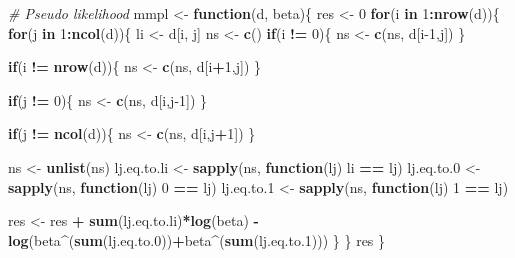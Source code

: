 \documentclass[
]{article}
\newenvironment{Shaded}{\begin{snugshade}}{\end{snugshade}}
\newcommand{\CommentTok}[1]{\textcolor[rgb]{0.56,0.35,0.01}{\textit{#1}}}
\newcommand{\ControlFlowTok}[1]{\textcolor[rgb]{0.13,0.29,0.53}{\textbf{#1}}}
\newcommand{\DecValTok}[1]{\textcolor[rgb]{0.00,0.00,0.81}{#1}}
\newcommand{\FloatTok}[1]{\textcolor[rgb]{0.00,0.00,0.81}{#1}}
\newcommand{\KeywordTok}[1]{\textcolor[rgb]{0.13,0.29,0.53}{\textbf{#1}}}
\newcommand{\NormalTok}[1]{#1}
\newcommand{\OperatorTok}[1]{\textcolor[rgb]{0.81,0.36,0.00}{\textbf{#1}}}
\newcommand{\StringTok}[1]{\textcolor[rgb]{0.31,0.60,0.02}{#1}}
\begin{document}
\begin{Shaded}
\begin{Highlighting}[]
\CommentTok{# Pseudo likelihood }
\NormalTok{mmpl <-}\StringTok{ }\ControlFlowTok{function}\NormalTok{(d, beta)\{}
\NormalTok{  res <-}\StringTok{ }\DecValTok{0}
  \ControlFlowTok{for}\NormalTok{(i }\ControlFlowTok{in} \DecValTok{1}\OperatorTok{:}\KeywordTok{nrow}\NormalTok{(d))\{}
    \ControlFlowTok{for}\NormalTok{(j }\ControlFlowTok{in} \DecValTok{1}\OperatorTok{:}\KeywordTok{ncol}\NormalTok{(d))\{}
\NormalTok{      li <-}\StringTok{ }\NormalTok{d[i, j]}
\NormalTok{      ns <-}\StringTok{ }\KeywordTok{c}\NormalTok{()}
      \ControlFlowTok{if}\NormalTok{(i }\OperatorTok{!=}\StringTok{ }\DecValTok{0}\NormalTok{)\{}
\NormalTok{        ns <-}\StringTok{ }\KeywordTok{c}\NormalTok{(ns, d[i}\DecValTok{-1}\NormalTok{,j])}
\NormalTok{      \}}
      
      \ControlFlowTok{if}\NormalTok{(i }\OperatorTok{!=}\StringTok{ }\KeywordTok{nrow}\NormalTok{(d))\{}
\NormalTok{        ns <-}\StringTok{ }\KeywordTok{c}\NormalTok{(ns, d[i}\OperatorTok{+}\DecValTok{1}\NormalTok{,j])}
\NormalTok{      \}}
      
      
      \ControlFlowTok{if}\NormalTok{(j }\OperatorTok{!=}\StringTok{ }\DecValTok{0}\NormalTok{)\{}
\NormalTok{        ns <-}\StringTok{ }\KeywordTok{c}\NormalTok{(ns, d[i,j}\DecValTok{-1}\NormalTok{])}
\NormalTok{      \}}
      
      \ControlFlowTok{if}\NormalTok{(j }\OperatorTok{!=}\StringTok{ }\KeywordTok{ncol}\NormalTok{(d))\{}
\NormalTok{        ns <-}\StringTok{ }\KeywordTok{c}\NormalTok{(ns, d[i,j}\OperatorTok{+}\DecValTok{1}\NormalTok{])}
\NormalTok{      \}}
      
\NormalTok{      ns <-}\StringTok{ }\KeywordTok{unlist}\NormalTok{(ns)}
\NormalTok{      lj.eq.to.li <-}\StringTok{ }\KeywordTok{sapply}\NormalTok{(ns, }\ControlFlowTok{function}\NormalTok{(lj) li }\OperatorTok{==}\StringTok{ }\NormalTok{lj)}
\NormalTok{      lj.eq.to}\FloatTok{.0}\NormalTok{ <-}\StringTok{ }\KeywordTok{sapply}\NormalTok{(ns, }\ControlFlowTok{function}\NormalTok{(lj) }\DecValTok{0} \OperatorTok{==}\StringTok{ }\NormalTok{lj)}
\NormalTok{      lj.eq.to}\FloatTok{.1}\NormalTok{ <-}\StringTok{ }\KeywordTok{sapply}\NormalTok{(ns, }\ControlFlowTok{function}\NormalTok{(lj) }\DecValTok{1} \OperatorTok{==}\StringTok{ }\NormalTok{lj)}
      
\NormalTok{      res <-}\StringTok{ }\NormalTok{res }\OperatorTok{+}\StringTok{ }\KeywordTok{sum}\NormalTok{(lj.eq.to.li)}\OperatorTok{*}\KeywordTok{log}\NormalTok{(beta) }\OperatorTok{-}\StringTok{ }\KeywordTok{log}\NormalTok{(beta}\OperatorTok{^}\NormalTok{(}\KeywordTok{sum}\NormalTok{(lj.eq.to}\FloatTok{.0}\NormalTok{))}\OperatorTok{+}\NormalTok{beta}\OperatorTok{^}\NormalTok{(}\KeywordTok{sum}\NormalTok{(lj.eq.to}\FloatTok{.1}\NormalTok{)))}
\NormalTok{    \}}
\NormalTok{  \}}
\NormalTok{  res}
\NormalTok{\}}


\end{Highlighting}
\end{Shaded}
\end{document}
